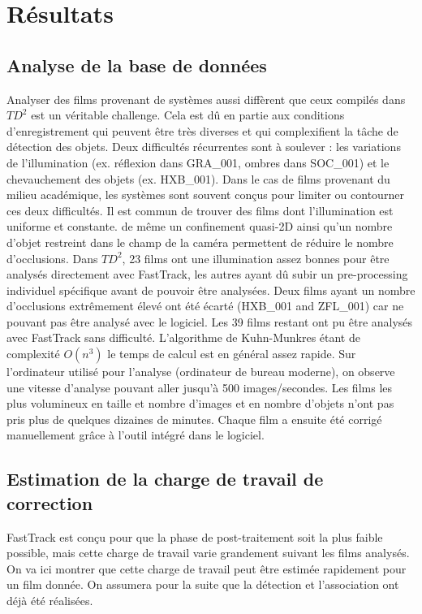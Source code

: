 \chapter{Résultats}

	\section{Analyse de la base de données}

  Analyser des films provenant de systèmes aussi diffèrent que ceux compilés dans $TD^2$ est un véritable challenge. Cela est dû en partie aux conditions d'enregistrement qui peuvent être très diverses et qui complexifient la tâche de détection des objets. Deux difficultés récurrentes sont à soulever : les variations de l'illumination (ex. réflexion dans GRA\_001, ombres dans SOC\_001) et le chevauchement des objets (ex. HXB\_001).
  Dans le cas de films provenant du milieu académique, les systèmes sont souvent conçus pour limiter ou contourner ces deux difficultés. Il est commun de trouver des films dont l'illumination est uniforme et constante. de même un confinement quasi-2D ainsi qu'un nombre d'objet restreint dans le champ de la caméra permettent de réduire le nombre d'occlusions.
  Dans $TD^2$, 23 films ont une illumination assez bonnes pour être analysés directement avec FastTrack, les autres ayant dû subir un pre-processing individuel spécifique avant de pouvoir être analysées. Deux films ayant un nombre d'occlusions extrêmement élevé ont été écarté (HXB\_001 and ZFL\_001) car ne pouvant pas être analysé avec le logiciel.
  Les 39 films restant ont pu être analysés avec FastTrack sans difficulté. L'algorithme de Kuhn-Munkres étant de complexité $O(n^3)$ le temps de calcul est en général assez rapide. Sur l'ordinateur utilisé pour l'analyse (ordinateur de bureau moderne), on observe une vitesse d'analyse pouvant aller jusqu’à 500 images/secondes. Les films les plus volumineux en taille et nombre d'images et en nombre d'objets n'ont pas pris plus de quelques dizaines de minutes. Chaque film a ensuite été corrigé manuellement grâce à l'outil intégré dans le logiciel.
	
	\section{Estimation de la charge de travail de correction}
	
	FastTrack est conçu pour que la phase de post-traitement soit la plus faible possible, mais cette charge de travail varie grandement suivant les films analysés. On va ici montrer que cette charge de travail peut être estimée rapidement pour un film donnée. On assumera pour la suite que la détection et l'association ont déjà été réalisées.\\
	
